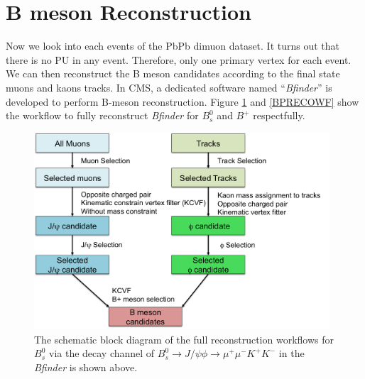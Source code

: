 
\section{B meson Reconstruction} 

Now we look into each events of the PbPb dimuon dataset. It turns out that there is no PU in any event. Therefore, only one primary vertex for each event. We can then reconstruct the B meson candidates according to the final state muons and kaons tracks. In CMS, a dedicated software named ``\textit{Bfinder}'' is developed to perform B-meson reconstruction. Figure \ref{BsRECOWF} and \ref{BPRECOWF} show the workflow to fully reconstruct \textit{Bfinder} for $B^0_s$ and $B^+$ respectfully.


\begin{figure}[h]
\begin{center}
\includegraphics[width= 0.98\textwidth]{Figures/Chapter4/BsmesonWorkflow.png}
\caption{The schematic block diagram of the full reconstruction workflows for $B^0_s$ via the decay channel of $B_s^0 \rightarrow J/\psi \phi \rightarrow \mu^+\mu^- K^+K^-$ in the \textit{Bfinder} is shown above.}
\label{BsRECOWF}
\end{center}
\end{figure}

